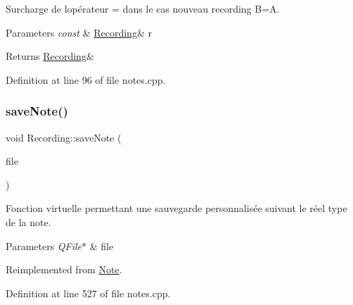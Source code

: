 Surcharge de l\textquotesingle{}opérateur = dans le cas nouveau recording B=A. 


\begin{DoxyParams}{Parameters}
{\em const} & \hyperlink{class_recording}{Recording}\& r \\
\hline
\end{DoxyParams}
\begin{DoxyReturn}{Returns}
\hyperlink{class_recording}{Recording}\& 
\end{DoxyReturn}


Definition at line 96 of file notes.\+cpp.

\mbox{\label{class_recording_a99e10c8a8c13bce5f70195b6c30a1cc9}} 
\subsubsection{\texorpdfstring{save\+Note()}{saveNote()}}
{\footnotesize\ttfamily void Recording\+::save\+Note (\begin{DoxyParamCaption}\item[{Q\+File $\ast$}]{file }\end{DoxyParamCaption})\hspace{0.3cm}{\ttfamily [virtual]}}



Fonction virtuelle permettant une sauvegarde personnalisée suivant le réel type de la note. 


\begin{DoxyParams}{Parameters}
{\em Q\+File$\ast$} & file \\
\hline
\end{DoxyParams}


Reimplemented from \hyperlink{class_note_a0c2cc72d7f3235c665a30ef915c5c58d}{Note}.



Definition at line 527 of file notes.\+cpp.

